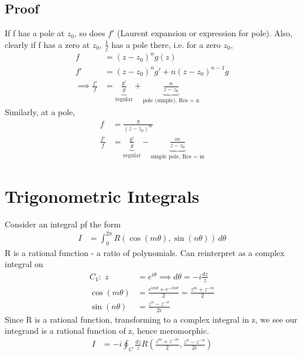 \documentclass[a4paper, 11pt, normalem]{report}
\begin{document}
\subsection{Proof}
If f has a pole at $z_0$, so does $f'$ (Laurent expansion or expression for pole).
Also, clearly if f has a zero at $z_0$, $\frac{1}{f}$ has a pole there, i.e. for a zero $z_0$,
\begin{align}
    f &= (z-z_0)^n g(z) \\
    f' &= (z-z_0)^n g' + n(z-z_0)^{n-1} g \\
    \implies \frac{f'}{f} &= \underbrace{\frac{g'}{g}}_{\text{regular}} + \underbrace{\frac{n}{z-z_0}}_{\text{pole (simple), Res = n}}
\end{align}
Similarly, at a pole,
\begin{align}
    f &= \frac{g}{(z-z_0)^m} \\
    \frac{f'}{f} &= \underbrace{\frac{g'}{g}}_{\text{regular}} - \underbrace{\frac{m}{z-z_0}}_{\text{simple pole, Res = m}}
\end{align}

\section{Trigonometric Integrals}
Consider an integral pf the form
\begin{align}
    I &= \int_0^{2\pi} R(\cos(m\theta),\sin(n\theta))\,d\theta
\end{align}
R is a rational function - a ratio of polynomials.
Can reinterpret as a complex integral on
\begin{align}
    C_1:\; z &= e^{i\theta} \implies d\theta = -i\frac{dz}{z} \\
    \cos(m\theta) &= \frac{e^{im\theta} + e^{-im\theta}}{2} = \frac{z^m + z^{-m}}{2} \\
    \sin(n\theta) &= \frac{z^n - z^{-n}}{2i}
\end{align}
Since R is a rational function, transforming to a complex integral in z, we see our integrand is a rational function of z, hence meromorphic.
\begin{align}
    I &= -i \oint_C \frac{dz}{z} R\left(\frac{z^m + z^{-m}}{2}, \frac{z^n - z^{-n}}{2i}\right)
\end{align}
\end{document}
